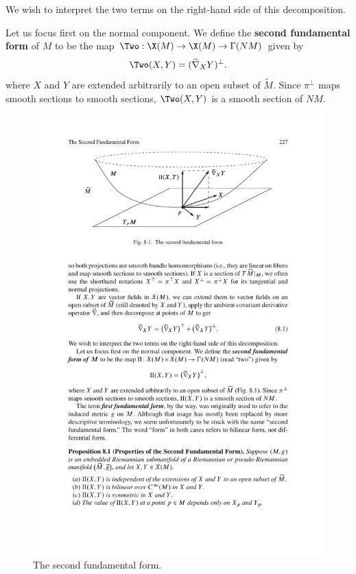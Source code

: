 We wish to interpret the two terms on the right-hand side of this decomposition.\par
Let us focus first on the normal component. We define the \textbf{second fundamental form} of $M$ to be the map $\Two:\X(M)\to\X(M)\to\Gamma(NM)$ given by
\[\Two(X,Y)=(\widetilde{\nabla}_XY)^\bot.\]
where $X$ and $Y$ are extended arbitrarily to an open subset of $\widetilde{M}$. Since $\pi^{\bot}$ maps smooth sections to smooth sections, $\Two(X,Y)$ is a smooth section of $NM$.
\begin{figure}[htbp]
\centering
\includegraphics{pictures/second-fundamental-form}
\caption{The second fundamental form.}
\end{figure}
